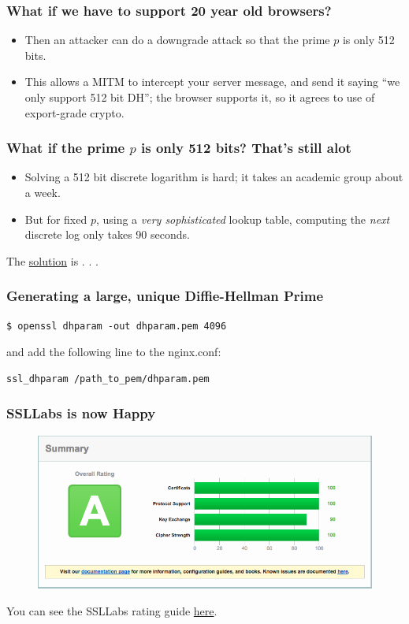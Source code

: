 \documentclass[9pt]{beamer}
\begin{document}
\begin{frame}[fragile]
\frametitle{What if we have to support 20 year old browsers?}
\begin{itemize}
\item Then an attacker can do a downgrade attack so that the prime $p$ is only 512 bits.
\pause
\item This allows a MITM to intercept your server message, and send it saying ``we only support 512 bit DH''; the browser supports it, so it agrees to use of export-grade crypto.
\end{itemize}
\end{frame}

\begin{frame}[fragile]
\frametitle{What if the prime $p$ is only 512 bits? That's still alot}
\begin{itemize}
\item Solving a 512 bit discrete logarithm is hard; it takes an academic group about a week.
\pause
\item But for fixed $p$, using a \emph{very sophisticated} lookup table, computing the \emph{next} discrete log only takes 90 seconds.
\pause
\end{itemize}
The \href{https://weakdh.org/sysadmin.html}{solution} is . . .
\end{frame}

\begin{frame}[fragile]
\frametitle{Generating a large, unique Diffie-Hellman Prime}
\begin{verbatim}
$ openssl dhparam -out dhparam.pem 4096
\end{verbatim}
and add the following line to the nginx.conf:
\begin{verbatim}
ssl_dhparam /path_to_pem/dhparam.pem
\end{verbatim}
\end{frame}

\begin{frame}[fragile]
\frametitle{SSLLabs is now Happy}
\begin{figure}
\includegraphics[scale=0.25]{figures/SSLLabsA.png}
\end{figure}
You can see the SSLLabs rating guide \href{https://www.ssllabs.com/downloads/SSL_Server_Rating_Guide.pdf}{here}.
\end{frame}
\end{document}
